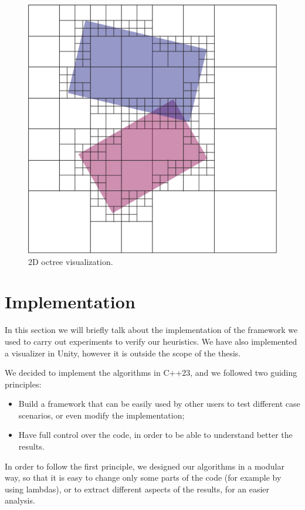 \documentclass[11pt,a4paper,twocolumn]{article}
\begin{document}
\begin{figure}[H]
    \centering
    \includegraphics[width=\textwidth*\real{0.27}]{Images/octree_for_influence_areas.png}
    \caption{2D octree visualization.}
    \label{fig:octree_for_influence_areas}
\end{figure}

\section{Implementation}
In this section we will briefly talk about the implementation of the framework we used to carry out experiments to verify our heuristics. We have also implemented a visualizer in Unity, however it is outside the scope of the thesis.

We decided to implement the algorithms in C++23, and we followed two guiding principles:
\begin{itemize}
    \item Build a framework that can be easily used by other users to test different case scenarios, or even modify the implementation;
    \item Have full control over the code, in order to be able to understand better the results.
\end{itemize}

In order to follow the first principle, we designed our algorithms in a modular way, so that it is easy to change only some parts of the code (for example by using lambdas), or to extract different aspects of the results, for an easier analysis.
\end{document}
